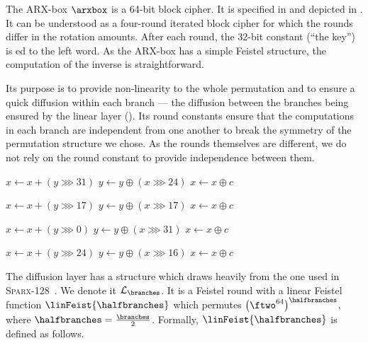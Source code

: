  
The ARX-box $\arxbox$ is a 64-bit block cipher. It is specified in  and depicted in . It can be understood as a four-round iterated block cipher for which the rounds differ in the rotation amounts. After each round, the 32-bit constant (``the key'') is \txor{}ed to the left word. As the ARX-box has a simple Feistel structure, the computation of the inverse is straightforward.

Its purpose is to provide non-linearity to the whole permutation and to ensure a quick diffusion within each branch --- the diffusion between the branches being ensured by the linear layer (). Its round constants ensure that the computations in each branch are independent from one another to break the symmetry of the permutation structure we chose. As the rounds themselves are different, we do not rely on the round constant to provide independence between them. 

\begin{algorithm}
  \begin{algorithmic}
  \State $x  \gets x + (y \ggg 31)$ 
  \State $y  \gets y \oplus (x \ggg 24)$
  \State $x \gets x \oplus c$
  
  \State $x  \gets x + (y \ggg 17)$ 
  \State $y  \gets y \oplus (x \ggg 17)$
  \State $x \gets x \oplus c$
  
  \State $x  \gets x + (y \ggg 0)$ 
  \State $y  \gets y \oplus (x \ggg 31)$
  \State $x \gets x \oplus c$
  
  \State $x  \gets x + (y \ggg 24)$ 
  \State $y  \gets y \oplus (x \ggg 16)$
  \State $x \gets x \oplus c$
  
  \end{algorithmic}
\end{algorithm}




The diffusion layer has a structure which draws heavily from the one used in \textsc{Sparx-128}~\cite{OurSPARX}. We denote it $\mathcal{L}_{\branches}$. It is a Feistel round with a linear Feistel function $\linFeist{\halfbranches}$ which permutes $\big(\ftwo^{64} \big)^{\halfbranches}$, where $\halfbranches = \frac{\branches}{2}$.
Formally, $\linFeist{\halfbranches}$ is defined as follows.

